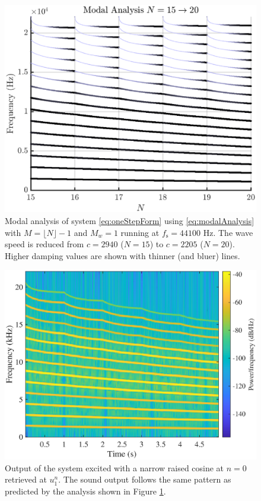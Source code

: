 \begin{figure}[t]
    \centering
\includegraphics[width=\figwidth\columnwidth]{Figures/modalAnalysisDamping.eps}
\caption{\label{fig:modalAnalysis}{Modal analysis of system \eqref{eq:oneStepForm} using \eqref{eq:modalAnalysis} with $M = \lfloor N\rfloor - 1$ and $M_w = 1$ running at $f_\text{s} = 44100$ Hz. The wave speed is reduced from $c = 2940$ ($N = 15$) to $c = 2205$ ($N = 20$). Higher damping values are shown with thinner (and bluer) lines.}}
\end{figure} 
\begin{figure}[t]
    \centering
\includegraphics[width=\figwidth\columnwidth]{Figures/specQuadratic2.eps}
\caption{\label{fig:spectrogram}{Output of the system excited with a narrow raised cosine at $n=0$ retrieved at $u_1^n$. The sound output follows the same pattern as predicted by the analysis shown in Figure \ref{fig:modalAnalysis}.}}
\end{figure} 


